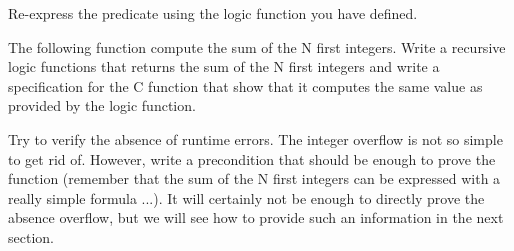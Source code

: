 Re-express the  predicate using the logic function you
have defined.



\label{l4:acsl-properties-functions-n-first-ints}


The following function compute the sum of the N first integers. Write a
recursive logic functions that returns the sum of the N first integers and
write a specification for the C function that show that it computes the same
value as provided by the logic function.




Try to verify the absence of runtime errors. The integer overflow is not so
simple to get rid of. However, write a precondition that should be enough to
prove the function (remember that the sum of the N first integers can be
expressed with a really simple formula ...). It will certainly not be enough
to directly prove the absence overflow, but we will see how to provide such
an information in the next section.
